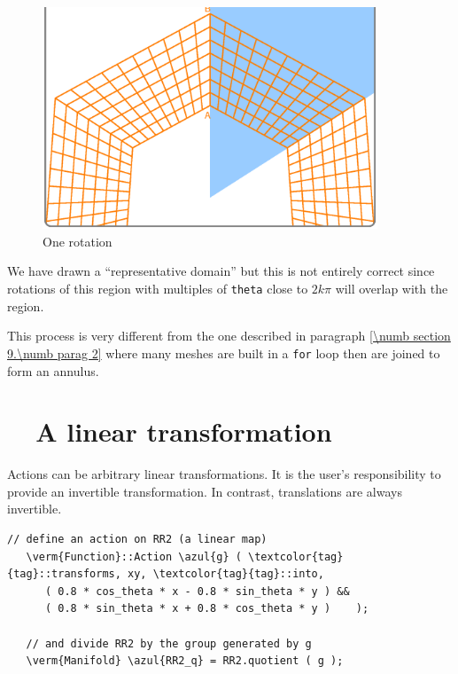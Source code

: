 \begin{figure}[ht] \centering
  \includegraphics[width=100mm]{sector-1.eps}
  \caption{One rotation}
  \label{\numb section 7.\numb fig 7}
\end{figure}

We have drawn a ``representative domain'' but this is not entirely correct since
rotations of this region with multiples of {\small\tt theta} close to $ 2k\pi $
will overlap with the region.

This process is very different from the one described in paragraph
\ref{\numb section 9.\numb parag 2}
where many meshes are built in a {\small\tt for} loop then are joined to form an annulus.


\section{~~A linear transformation}\label{\numb section 7.\numb parag 12}

Actions can be arbitrary linear transformations.
It is the user's responsibility to provide an invertible transformation.
In contrast, translations are always invertible.

\begin{Verbatim}[commandchars=\\\{\},formatcom=\small\tt,frame=single,
   label=parag-\ref{\numb section 7.\numb parag 12}.cpp,rulecolor=\color{coment},
   baselinestretch=0.94,framesep=2mm                                             ]
   // define an action on RR2 (a linear map)
   \verm{Function}::Action \azul{g} ( \textcolor{tag}{tag}::transforms, xy, \textcolor{tag}{tag}::into,
      ( 0.8 * cos_theta * x - 0.8 * sin_theta * y ) &&
      ( 0.8 * sin_theta * x + 0.8 * cos_theta * y )    );

   // and divide RR2 by the group generated by g
   \verm{Manifold} \azul{RR2_q} = RR2.quotient ( g );
\end{Verbatim}

